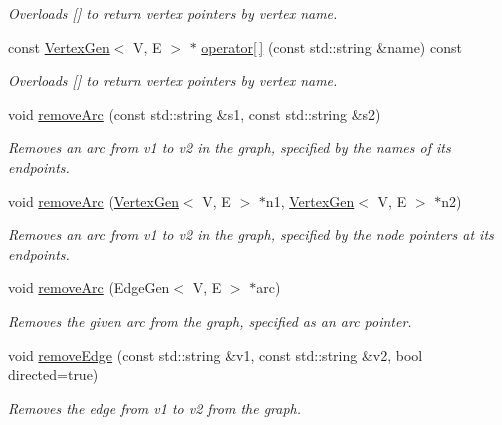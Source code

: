 \begin{DoxyCompactItemize}
\begin{DoxyCompactList}\small\item\em Overloads {\ttfamily \mbox{[}\mbox{]}} to return vertex pointers by vertex name. \end{DoxyCompactList}\item 
const \mbox{\hyperlink{classVertexGen}{Vertex\+Gen}}$<$ V, E $>$ $\ast$ \mbox{\hyperlink{classBasicGraphGen_ad91a5b6ebd034841cf4f4c410fb7ed1b}{operator\mbox{[}$\,$\mbox{]}}} (const std\+::string \&name) const
\begin{DoxyCompactList}\small\item\em Overloads {\ttfamily \mbox{[}\mbox{]}} to return vertex pointers by vertex name. \end{DoxyCompactList}\item 
void \mbox{\hyperlink{classGraph_af6370fb52d2dab4eb7795da22c33dd02}{remove\+Arc}} (const std\+::string \&s1, const std\+::string \&s2)
\begin{DoxyCompactList}\small\item\em Removes an arc from v1 to v2 in the graph, specified by the names of its endpoints. \end{DoxyCompactList}\item 
void \mbox{\hyperlink{classGraph_ae0c9f44b20b49ffae9fecc0a4f156ac1}{remove\+Arc}} (\mbox{\hyperlink{classVertexGen}{Vertex\+Gen}}$<$ V, E $>$ $\ast$n1, \mbox{\hyperlink{classVertexGen}{Vertex\+Gen}}$<$ V, E $>$ $\ast$n2)
\begin{DoxyCompactList}\small\item\em Removes an arc from v1 to v2 in the graph, specified by the node pointers at its endpoints. \end{DoxyCompactList}\item 
void \mbox{\hyperlink{classGraph_a9d6580d1b0228fe6c1a02dfe70de1abf}{remove\+Arc}} (Edge\+Gen$<$ V, E $>$ $\ast$arc)
\begin{DoxyCompactList}\small\item\em Removes the given arc from the graph, specified as an arc pointer. \end{DoxyCompactList}\item 
void \mbox{\hyperlink{classBasicGraphGen_adfee7a20d0c13cc515b3b7e951d8baf2}{remove\+Edge}} (const std\+::string \&v1, const std\+::string \&v2, bool directed=true)
\begin{DoxyCompactList}\small\item\em Removes the edge from v1 to v2 from the graph. \end{DoxyCompactList}\item 

\end{DoxyCompactItemize}
